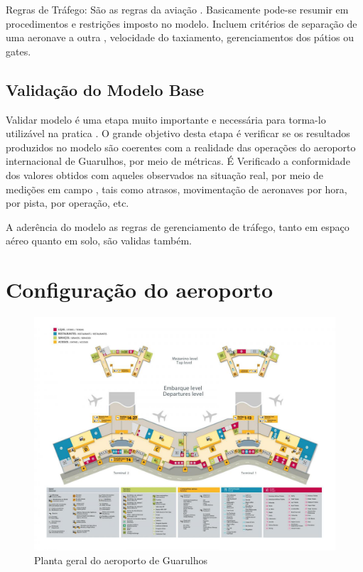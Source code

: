 \documentclass[12pt]{article}
\begin{document}
  Regras de Tráfego: São as regras da aviação . Basicamente pode-se resumir
  em procedimentos e restrições imposto no modelo. Incluem critérios de 
  separação de uma aeronave a outra , velocidade do taxiamento, gerenciamentos
  dos pátios ou gates.
  
  
  \subsection{Validação do Modelo Base}
  Validar modelo é uma etapa muito importante e necessária para torma-lo 
  utilizável na pratica . O grande objetivo desta etapa é verificar se os
  resultados produzidos no modelo são coerentes com a realidade das operações
  do aeroporto internacional de Guarulhos, por meio de métricas. 
  É Verificado a conformidade dos valores obtidos com aqueles observados na
  situação real, por meio de medições em campo , tais como atrasos,
  movimentação de aeronaves por hora, por pista, por operação, etc.
  
  A aderência do modelo as regras de gerenciamento de tráfego, tanto em espaço
  aéreo quanto em solo, são validas também.
  
  
  \section{Configuração do aeroporto}
  
  \begin{figure}[b!]
    \centering
    \includegraphics[width=.9\textwidth]{aeroporto.png}
    \caption{Planta geral do aeroporto de Guarulhos}
    \label{fig:aeropoto}
  \end{figure}
  
\end{document}
